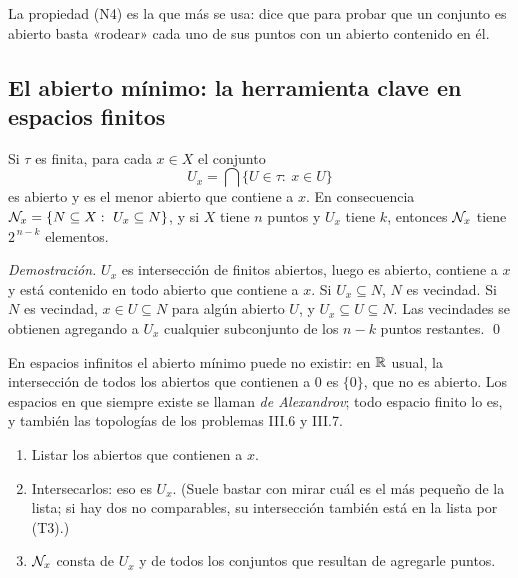 La propiedad (N4) es la que más se usa: dice que para probar que un conjunto es abierto basta «rodear» cada uno de
sus puntos con un abierto contenido en él.

\subsection{El abierto mínimo: la herramienta clave en espacios finitos}\label{sec:minimo}
\begin{teorema}
Si $\tau$ es finita, para cada $x\in X$ el conjunto
\[U_x=\bigcap\{U\in\tau:\ x\in U\}\]
es abierto y es el menor abierto que contiene a $x$. En consecuencia $\N_x=\{N\subseteq X:\ U_x\subseteq N\}$, y si
$X$ tiene $n$ puntos y $U_x$ tiene $k$, entonces $\mathcal{N}_x$ tiene $2^{\,n-k}$ elementos.
\end{teorema}
\emph{Demostración.} $U_x$ es intersección de finitos abiertos, luego es abierto, contiene a $x$ y está contenido en
todo abierto que contiene a $x$. Si $U_x\subseteq N$, $N$ es vecindad. Si $N$ es vecindad, $x\in U\subseteq N$ para
algún abierto $U$, y $U_x\subseteq U\subseteq N$. Las vecindades se obtienen agregando a $U_x$ cualquier subconjunto de
los $n-k$ puntos restantes. \qed

En espacios infinitos el abierto mínimo puede no existir: en $\mathbb{R}$ usual, la intersección de todos los abiertos que
contienen a $0$ es $\{0\}$, que no es abierto. Los espacios en que siempre existe se llaman \emph{de Alexandrov}; todo
espacio finito lo es, y también las topologías de los problemas III.6 y III.7.

\begin{metodo}
\begin{enumerate}[leftmargin=1.6em]
\item Listar los abiertos que contienen a $x$.
\item Intersecarlos: eso es $U_x$. (Suele bastar con mirar cuál es el más pequeño de la lista; si hay dos no
comparables, su intersección también está en la lista por (T3).)
\item $\mathcal{N}_x$ consta de $U_x$ y de todos los conjuntos que resultan de agregarle puntos.
\end{enumerate}
\end{metodo}


